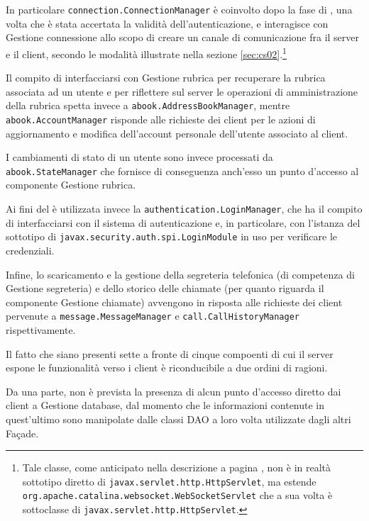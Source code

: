 \begin{description}
In particolare \texttt{connection.ConnectionManager} è coinvolto dopo la fase di , una volta che è stata accertata la validità dell'autenticazione, e interagisce con \textsf{Gestione connessione} allo scopo di creare un canale di comunicazione fra il server e il client, secondo le modalità illustrate nella sezione \ref{sec:cs02}.\footnote{%
Tale classe, come anticipato nella descrizione a pagina \pageref{sec:cs02}, non è in realtà sottotipo diretto di \texttt{javax.servlet.http.HttpServlet}, ma estende \texttt{org.apache.catalina.websocket.WebSocketServlet} che a sua volta è sottoclasse di \texttt{javax.servlet.http.HttpServlet}.
}

Il compito di interfacciarsi con \textsf{Gestione rubrica} per recuperare la rubrica associata ad un utente e per riflettere sul server le operazioni di amministrazione della rubrica spetta invece a \texttt{abook.AddressBookManager}, mentre \texttt{abook.AccountManager} risponde alle richieste dei client per le azioni di aggiornamento e modifica dell'account personale dell'utente associato al client.

I cambiamenti di stato di un utente sono invece processati da \texttt{abook.StateManager} che fornisce di conseguenza anch'esso un punto d'accesso al componente \textsf{Gestione rubrica}.

Ai fini del  è utilizzata invece la  \texttt{authentication.LoginManager}, che ha il compito di interfacciarsi con il sistema di autenticazione e, in particolare, con l'istanza del sottotipo di \texttt{javax.security.auth.spi.LoginModule} in uso per verificare le credenziali.

Infine, lo scaricamento e la gestione della segreteria telefonica (di competenza di \textsf{Gestione segreteria}) e dello storico delle chiamate (per quanto riguarda il componente \textsf{Gestione chiamate}) avvengono in risposta alle richieste dei client pervenute a \texttt{message.MessageManager} e \texttt{call.CallHistoryManager} rispettivamente.

Il fatto che siano presenti sette  a fronte di cinque compoenti di cui il server espone le funzionalità verso i client è riconducibile a due ordini di ragioni.

Da una parte, non è prevista la presenza di alcun punto d'accesso diretto dai client a \textsf{Gestione database}, dal momento che le informazioni contenute in quest'ultimo sono manipolate dalle classi DAO a loro volta utilizzate dagli altri Façade.


\end{description}
